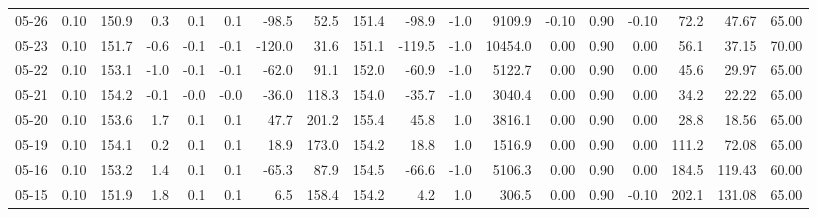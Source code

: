 \begin{threeparttable}
{\begin{tabular}{lrrrrrrrrrrrrrrrrr}
  05-26 &     0.10 & 150.9 &               0.3 &               0.1 &                0.1 &              -98.5 &   52.5 & 151.4 &      -98.9 &                     -1.0 &              9109.9 &      -0.10 &      0.90 &          -0.10 &             72.2 &           47.67 &                  65.00 \\
  05-23 &     0.10 & 151.7 &              -0.6 &              -0.1 &               -0.1 &             -120.0 &   31.6 & 151.1 &     -119.5 &                     -1.0 &             10454.0 &       0.00 &      0.90 &           0.00 &             56.1 &           37.15 &                  70.00 \\
  05-22 &     0.10 & 153.1 &              -1.0 &              -0.1 &               -0.1 &              -62.0 &   91.1 & 152.0 &      -60.9 &                     -1.0 &              5122.7 &       0.00 &      0.90 &           0.00 &             45.6 &           29.97 &                  65.00 \\
  05-21 &     0.10 & 154.2 &              -0.1 &              -0.0 &               -0.0 &              -36.0 &  118.3 & 154.0 &      -35.7 &                     -1.0 &              3040.4 &       0.00 &      0.90 &           0.00 &             34.2 &           22.22 &                  65.00 \\
  05-20 &     0.10 & 153.6 &               1.7 &               0.1 &                0.1 &               47.7 &  201.2 & 155.4 &       45.8 &                      1.0 &              3816.1 &       0.00 &      0.90 &           0.00 &             28.8 &           18.56 &                  65.00 \\
  05-19 &     0.10 & 154.1 &               0.2 &               0.1 &                0.1 &               18.9 &  173.0 & 154.2 &       18.8 &                      1.0 &              1516.9 &       0.00 &      0.90 &           0.00 &            111.2 &           72.08 &                  65.00 \\
  05-16 &     0.10 & 153.2 &               1.4 &               0.1 &                0.1 &              -65.3 &   87.9 & 154.5 &      -66.6 &                     -1.0 &              5106.3 &       0.00 &      0.90 &           0.00 &            184.5 &          119.43 &                  60.00 \\
  05-15 &     0.10 & 151.9 &               1.8 &               0.1 &                0.1 &                6.5 &  158.4 & 154.2 &        4.2 &                      1.0 &               306.5 &       0.00 &      0.90 &          -0.10 &            202.1 &          131.08 &                  65.00 \\

\end{tabular}}
\end{threeparttable}
